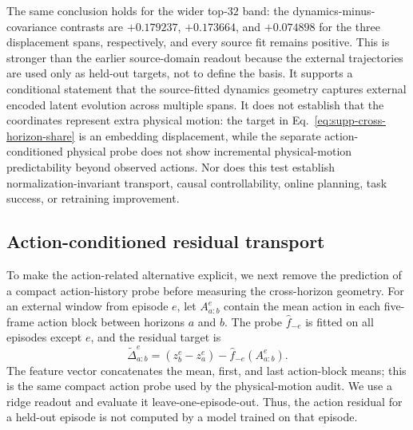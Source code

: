 \documentclass{article}
\begin{document}
The same conclusion holds for the wider top-$32$ band: the dynamics-minus-
covariance contrasts are $+0.179237$, $+0.173664$, and $+0.074898$ for the
three displacement spans, respectively, and every source fit remains
positive. This is stronger than the earlier source-domain readout because the
external trajectories are used only as held-out targets, not to define the
basis. It supports a conditional statement that the source-fitted dynamics
geometry captures external encoded latent evolution across multiple spans.
It does not establish that the coordinates represent extra physical motion:
the target in Eq.~\eqref{eq:supp-cross-horizon-share} is an embedding
displacement, while the separate action-conditioned physical probe does not
show incremental physical-motion predictability beyond observed actions.
Nor does this test establish normalization-invariant transport, causal
controllability, online planning, task success, or retraining improvement.

\subsection{Action-conditioned residual transport}
\label{sec:supp-action-residual-transport}

To make the action-related alternative explicit, we next remove the prediction
of a compact action-history probe before measuring the cross-horizon geometry.
For an external window from episode $e$, let $A^{e}_{a:b}$ contain the mean
action in each five-frame action block between horizons $a$ and $b$. The probe
$\widehat f_{-e}$ is fitted on all episodes except $e$, and the residual target
is
\begin{equation}
\widetilde{\Delta}^{e}_{a:b}=
\left(z^{e}_{b}-z^{e}_{a}\right)-
\widehat f_{-e}\!\left(A^{e}_{a:b}\right).
\label{eq:supp-action-residual}
\end{equation}
The feature vector concatenates the mean, first, and last action-block means;
this is the same compact action probe used by the physical-motion audit. We
use a ridge readout and evaluate it leave-one-episode-out. Thus, the action
residual for a held-out episode is not computed by a model trained on that
episode.
\end{document}
